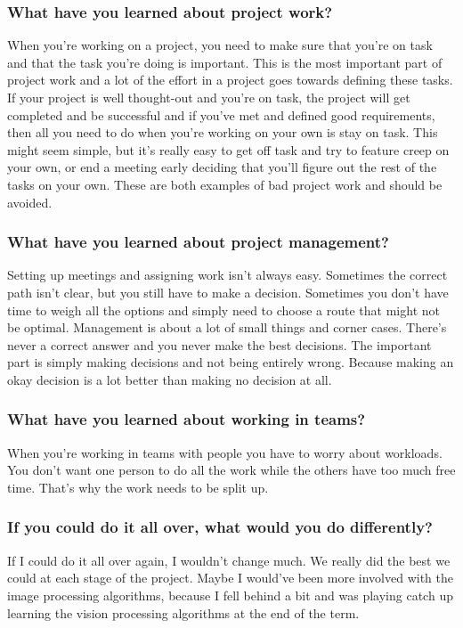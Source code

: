 \subsubsection{What have you learned about project work?}
\par
When you're working on a project, you need to make sure that you're on task and that the task you're doing is important. This is the most important part of project work and a lot of the effort in a project goes towards defining these tasks. If your project is well thought-out and you're on task, the project will get completed and be successful and if you've met and defined good requirements, then all you need to do when you're working on your own is stay on task. This might seem simple, but it's really easy to get off task and try to feature creep on your own, or end a meeting early deciding that you'll figure out the rest of the tasks on your own. These are both examples of bad project work and should be avoided.
\subsubsection{What have you learned about project management?}
\par
Setting up meetings and assigning work isn't always easy. Sometimes the correct path isn't clear, but you still have to make a decision. Sometimes you don't have time to weigh all the options and simply need to choose a route that might not be optimal. Management is about a lot of small things and corner cases. There's never a correct answer and you never make the best decisions. The important part is simply making decisions and not being entirely wrong. Because making an okay decision is a lot better than making no decision at all.
\subsubsection{What have you learned about working in teams?}
\par
When you're working in teams with people you have to worry about workloads. You don't want one person to do all the work while the others have too much free time. That's why the work needs to be split up.
\subsubsection{If you could do it all over, what would you do differently?}
\par
If I could do it all over again, I wouldn't change much. We really did the best we could at each stage of the project. Maybe I would've been more involved with the image processing algorithms, because I fell behind a bit and was playing catch up learning the vision processing algorithms at the end of the term.
